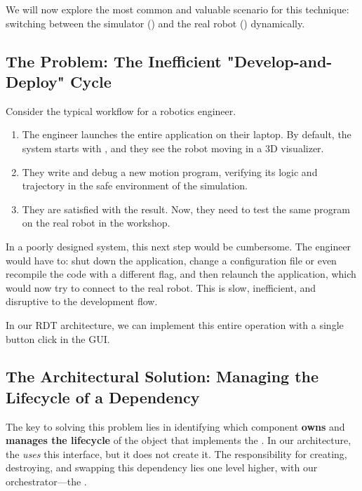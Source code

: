 We will now explore the most common and valuable scenario for this technique: switching between the simulator () and the real robot () dynamically.

\subsection{The Problem: The Inefficient "Develop-and-Deploy" Cycle}
\label{subsec:develop_deploy_problem}

Consider the typical workflow for a robotics engineer.
\begin{enumerate}
    \item The engineer launches the entire application on their laptop. By default, the system starts with , and they see the robot moving in a 3D visualizer.
    \item They write and debug a new motion program, verifying its logic and trajectory in the safe environment of the simulation.
    \item They are satisfied with the result. Now, they need to test the same program on the real robot in the workshop.
\end{enumerate}

In a poorly designed system, this next step would be cumbersome. The engineer would have to: shut down the application, change a configuration file or even recompile the code with a different flag, and then relaunch the application, which would now try to connect to the real robot. This is slow, inefficient, and disruptive to the development flow.

In our RDT architecture, we can implement this entire operation with a single button click in the GUI.

\subsection{The Architectural Solution: Managing the Lifecycle of a Dependency}
\label{subsec:dependency_lifecycle_solution}

The key to solving this problem lies in identifying which component \textbf{owns} and \textbf{manages the lifecycle} of the object that implements the . In our architecture, the  \textit{uses} this interface, but it does not create it. The responsibility for creating, destroying, and swapping this dependency lies one level higher, with our orchestrator—the \textbf{}.

